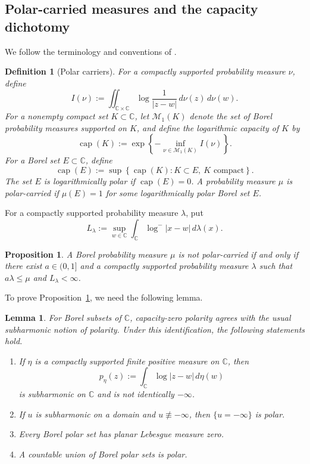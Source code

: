 \documentclass[10pt,reqno]{amsart}
\newtheorem{proposition}[theorem]{Proposition}
\newtheorem{lemma}[theorem]{Lemma}
\newtheorem{definition}[theorem]{Definition}
\theoremstyle{remark}
\newcommand{\C}{\mathbb C}
\newcommand{\logm}{\log^-}
\begin{document}
\subsection{Polar-carried measures and the capacity dichotomy}
We follow the terminology and conventions of \cite{Ran95}.
\begin{definition}[Polar carriers]
For a compactly supported probability measure $\nu$, define
\[I(\nu):=\iint_{\C\times\C}\log\frac{1}{|z-w|}\,d\nu(z)\,d\nu(w).\]
For a nonempty compact set $K\subset\C$, let $\mathcal M_1(K)$ denote the set of Borel probability measures supported on $K$, and define the logarithmic capacity of $K$ by
\[\operatorname{cap}(K):=\exp\left\{-\inf_{\nu\in\mathcal M_1(K)}I(\nu)\right\}.\]
For a Borel set $E\subset\C$, define
\[\operatorname{cap}(E) :=
 \sup\left\{\operatorname{cap}(K):
 K\subset E,\ K\text{ compact}\right\}.\]
The set $E$ is \emph{logarithmically polar} if $\operatorname{cap}(E)=0$. A probability measure $\mu$ is \emph{polar-carried} if $\mu(E)=1$ for some logarithmically polar Borel set $E$.
\end{definition}

For a compactly supported probability measure $\lambda$, put
\[L_\lambda:=\sup_{w\in\C}\int_\C\logm|x-w|\,d\lambda(x).\]

\begin{proposition}\label{prop:capacity-equivalence}
    A Borel probability measure $\mu$ is not polar-carried if and only if there exist $a\in(0,1]$ and a compactly supported probability measure $\lambda$ such that $a\lambda\le \mu$ and $L_\lambda<\infty$.
\end{proposition}
To prove Proposition~\ref{prop:capacity-equivalence}, we need the following lemma.
\begin{lemma}\cite{Ran95}\label{lem:polar-facts}
    For Borel subsets of $\C$, capacity-zero polarity agrees with the usual subharmonic notion of polarity. Under this identification, the following statements hold. 
    \begin{enumerate}
        \item [(1)][Theorem 3.1.2] If $\eta$ is a compactly supported finite positive measure on $\C$, then 
        \[p_\eta(z):=\int_\C \log|z-w|\,d\eta(w)\]
        is subharmonic on $\C$ and is not identically $-\infty$. 
        \item [(2)][Theorem 3.5.1] If $u$ is subharmonic on a domain and $u\not\equiv -\infty$, then $\{u=-\infty\}$ is polar.
        \item [(3)][Corollary 3.2.4] Every Borel polar set has planar Lebesgue measure zero.
        \item [(4)][Corollary 3.2.5] A countable union of Borel polar sets is polar.
    \end{enumerate}
\end{lemma}
\end{document}
